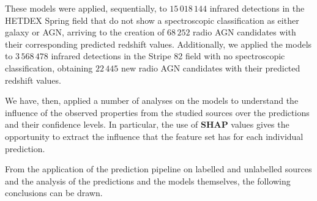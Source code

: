 \documentclass{aa}
\begin{document}
These models were applied, sequentially, to $15\,018\,144$ infrared detections in the HETDEX Spring field that do not show a spectroscopic classification as either galaxy or AGN, arriving to the creation of $68\,252$ radio AGN candidates with their corresponding predicted redshift values. Additionally, we applied the models to $3\,568\,478$ infrared detections in the Stripe 82 field with no spectroscopic classification, obtaining $22\,445$ new radio AGN candidates with their predicted redshift values.

We have, then, applied a number of analyses on the models to understand the influence of the observed properties from the studied sources over the predictions and their confidence levels. In particular, the use of \textbf{SHAP} values gives the opportunity to extract the influence that the feature set has for each individual prediction.

From the application of the prediction pipeline on labelled and unlabelled sources and the analysis of the predictions and the models themselves, the following conclusions can be drawn.
\end{document}

